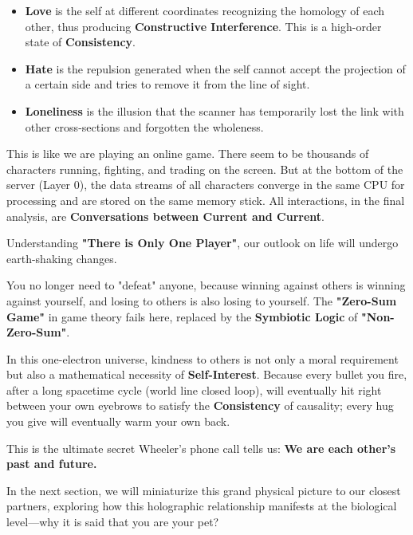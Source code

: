 \begin{itemize}
\item \textbf{Love} is the self at different coordinates recognizing the homology of each other, thus producing \textbf{Constructive Interference}. This is a high-order state of \textbf{Consistency}.
\item \textbf{Hate} is the repulsion generated when the self cannot accept the projection of a certain side and tries to remove it from the line of sight.
\item \textbf{Loneliness} is the illusion that the scanner has temporarily lost the link with other cross-sections and forgotten the wholeness.
\end{itemize}

This is like we are playing an online game. There seem to be thousands of characters running, fighting, and trading on the screen. But at the bottom of the server (Layer 0), the data streams of all characters converge in the same CPU for processing and are stored on the same memory stick. All interactions, in the final analysis, are \textbf{Conversations between Current and Current}.

Understanding \textbf{"There is Only One Player"}, our outlook on life will undergo earth-shaking changes.

You no longer need to "defeat" anyone, because winning against others is winning against yourself, and losing to others is also losing to yourself. The \textbf{"Zero-Sum Game"} in game theory fails here, replaced by the \textbf{Symbiotic Logic} of \textbf{"Non-Zero-Sum"}.

In this one-electron universe, kindness to others is not only a moral requirement but also a mathematical necessity of \textbf{Self-Interest}. Because every bullet you fire, after a long spacetime cycle (world line closed loop), will eventually hit right between your own eyebrows to satisfy the \textbf{Consistency} of causality; every hug you give will eventually warm your own back.

This is the ultimate secret Wheeler's phone call tells us: \textbf{We are each other's past and future.}

In the next section, we will miniaturize this grand physical picture to our closest partners, exploring how this holographic relationship manifests at the biological level—why it is said that you are your pet?

